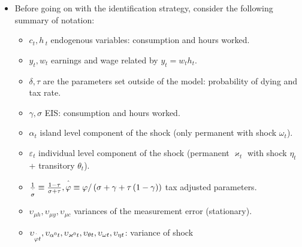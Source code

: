 \documentclass[notes=show]{beamer}
\begin{document}
\begin{frame}%


\begin{itemize}
\item Before going on with the identification strategy, consider the
following summary of notation:

\begin{itemize}
\item $c_{t},h\,_{t}$ endogenous variables: consumption and hours worked.

\item $y_{t},w_{t}$ earnings and wage related by $y_{t}=w_{t}h_{t}$.

\item $\delta ,\tau $ are the parameters set outside of the model:
probability of dying and tax rate.

\item $\gamma ,\sigma $ EIS: consumption and hours worked.

\item $\alpha _{t}$ island level component of the shock (only permanent with
shock $\omega _{t}$).

\item $\varepsilon _{t}$ individual level component of the shock (permanent $%
\varkappa _{t}$ with shock $\eta _{t}$ + transitory $\theta _{t}$).

\item $\frac{1}{\overset{\symbol{94}}{\sigma }}\equiv \frac{1-\tau }{\sigma
+\tau },\overset{\symbol{94}}{\varphi }\equiv \varphi /\left( \sigma +\gamma
+\tau \left( 1-\gamma \right) \right) $ tax adjusted parameters.

\item $\upsilon _{\mu h},\upsilon _{\mu y},\upsilon _{\mu c}$ variances of
the measurement error (stationary).

\item $\upsilon _{\overset{\symbol{94}}{\varphi }t},\upsilon _{\alpha
^{0}t},\upsilon _{\varkappa ^{0}t},\upsilon _{\theta t},\upsilon _{\omega
t},\upsilon _{\eta t}$: variance of shock
\end{itemize}
\end{itemize}

\transboxout%
\end{frame}%
\end{document}
